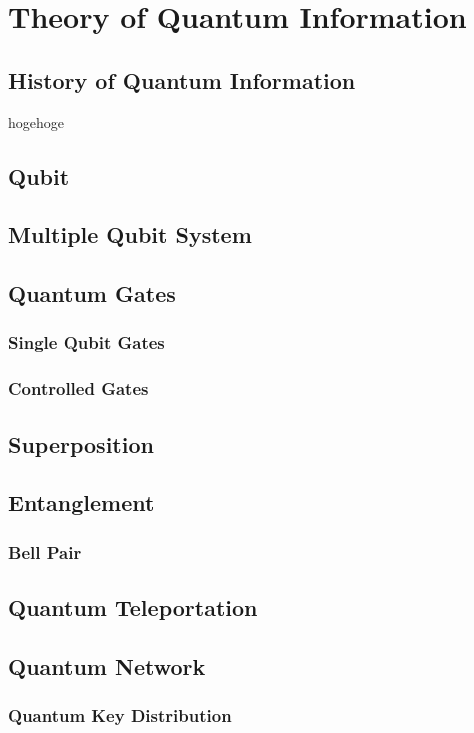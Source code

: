 \chapter{Theory of Quantum Information}
\label{theory_of_quantum_information}
\section{History of Quantum Information}
hogehoge
\section{Qubit}

\section{Multiple Qubit System}

\section{Quantum Gates}
\subsection{Single Qubit Gates}
\subsection{Controlled Gates}

\section{Superposition}

\section{Entanglement}
\subsection{Bell Pair}

\section{Quantum Teleportation}

\section{Quantum Network}
\subsection{Quantum Key Distribution}
